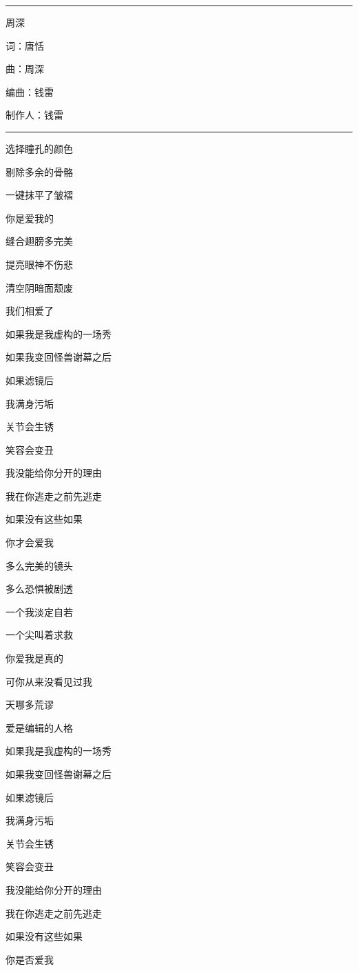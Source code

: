 \documentclass[]{ctexbook}
\begin{document}
\begin{center}\rule{0.5\linewidth}{0.5pt}\end{center}

周深

词：唐恬

曲：周深

编曲：钱雷

制作人：钱雷

\begin{center}\rule{0.5\linewidth}{0.5pt}\end{center}

选择瞳孔的颜色

剔除多余的骨骼

一键抹平了皱褶

你是爱我的

缝合翅膀多完美

提亮眼神不伤悲

清空阴暗面颓废

我们相爱了

如果我是我虚构的一场秀

如果我变回怪兽谢幕之后

如果滤镜后

我满身污垢

关节会生锈

笑容会变丑

我没能给你分开的理由

我在你逃走之前先逃走

如果没有这些如果

你才会爱我

多么完美的镜头

多么恐惧被剧透

一个我淡定自若

一个尖叫着求救

你爱我是真的

可你从来没看见过我

天哪多荒谬

爱是编辑的人格

如果我是我虚构的一场秀

如果我变回怪兽谢幕之后

如果滤镜后

我满身污垢

关节会生锈

笑容会变丑

我没能给你分开的理由

我在你逃走之前先逃走

如果没有这些如果

你是否爱我
\end{document}
